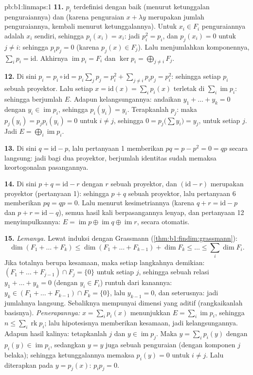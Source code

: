 \begin{solution}{pb:b1:linmaps:1}
\textbf{11.}  $p_i$ terdefinisi dengan baik (menurut ketunggalan
penguraiannya) dan  (karena penguraian $x + \lambda y$
merupakan jumlah penguraiannya, kembali menurut ketunggalannya). Untuk $x_i
\in F_i$ penguraiannya adalah $x_i$ sendiri, sehingga $p_i(x_i) = x_i$:
jadi $p_i^2 = p_i$, dan $p_j(x_i) = 0$ untuk $j \neq i$: sehingga $p_i p_j = 0$
(karena $p_j(x) \in F_j$). Lalu menjumlahkan komponennya, $\sum_i p_i =
\mathrm{id}$. Akhirnya $\operatorname{im} p_i = F_i$ dan $\ker
p_i = \bigoplus_{j \neq i} F_j$.

\textbf{12.} Di sini $p_i = p_i \circ \mathrm{id} = p_i\sum_j p_j =
p_i^2 + \sum_{j \neq i} p_i p_j = p_i^2$: sehingga setiap $p_i$ sebuah
proyektor. Lalu setiap $x = \mathrm{id}(x) = \sum_i p_i(x)$ terletak di
$\sum_i \operatorname{im} p_i$: sehingga  berjumlah $E$.
Adapun kelangsungannya: andaikan $y_1 + \dots + y_k = 0$ dengan $y_i \in
\operatorname{im} p_i$, sehingga $p_i(y_i) = y_i$. Terapkanlah $p_j$: maka $p_j
(y_i) = p_j p_i (y_i) = 0$ untuk $i \neq j$, sehingga $0 = p_j\bigl(\sum
y_i\bigr) = y_j$, untuk setiap $j$. Jadi $E = \bigoplus_i
\operatorname{im} p_i$.

\textbf{13.} Di sini $q = \mathrm{id} - p$, lalu pertanyaan 1 memberikan $pq =
p - p^2 = 0 = qp$ secara langsung: jadi bagi dua proyektor, berjumlah
identitas sudah memaksa keortogonalan pasangannya.

\textbf{14.} Di sini $p + q = \mathrm{id} - r$ dengan $r$ sebuah proyektor, dan
$(\mathrm{id} - r)$ merupakan proyektor (pertanyaan 1): sehingga $p + q$ sebuah
proyektor, lalu pertanyaan 6 memberikan $pq = qp = 0$. Lalu menurut kesimetriannya (karena $q +
r = \mathrm{id} - p$ dan $p + r = \mathrm{id} - q$), semua
hasil kali berpasangannya lenyap, dan pertanyaan 12 menyimpulkannya: $E =
\operatorname{im} p \oplus \operatorname{im} q \oplus
\operatorname{im} r$, secara otomatis.

\textbf{15.} \emph{Lemanya.} Lewat induksi dengan Grassmann
(\cref{thm:b1:findim:grassmann}):
\[
\dim(F_1 + \dots + F_k) \leq \dim(F_1 + \dots + F_{k-1}) + \dim
F_k \leq \dots \leq \sum_i \dim F_i .
\]
Jika totalnya berupa kesamaan, maka setiap langkahnya demikian: $(F_1 + \dots +
F_{j-1}) \cap F_j = \{0\}$ untuk setiap $j$, sehingga sebuah relasi $y_1 +
\dots + y_k = 0$ (dengan $y_i \in F_i$) runtuh dari kanannya: $y_k
\in (F_1 + \dots + F_{k-1}) \cap F_k = \{0\}$, lalu $y_{k-1} =
0$, dan seterusnya: jadi jumlahnya langsung. Sebaliknya  mempunyai
dimensi yang aditif (rangkaikanlah basisnya). \emph{Penerapannya:}
$x = \sum_i p_i(x)$ menunjukkan $E = \sum_i \operatorname{im} p_i$,
sehingga $n \leq \sum_i \operatorname{rk} p_i$; lalu hipotesisnya memberikan
kesamaan, jadi kelangsungannya. Adapun hasil kalinya: tetapkanlah $j$ dan $y \in
\operatorname{im} p_j$. Maka $y = \sum_i p_i(y)$ dengan $p_i(y)
\in \operatorname{im} p_i$, sedangkan $y = y$ juga sebuah
penguraian (dengan komponen $j$ belaka); sehingga ketunggalannya memaksa $p_i(y)
= 0$ untuk $i \neq j$. Lalu diterapkan pada $y = p_j(x)$: $p_i p_j = 0$.


\end{solution}
